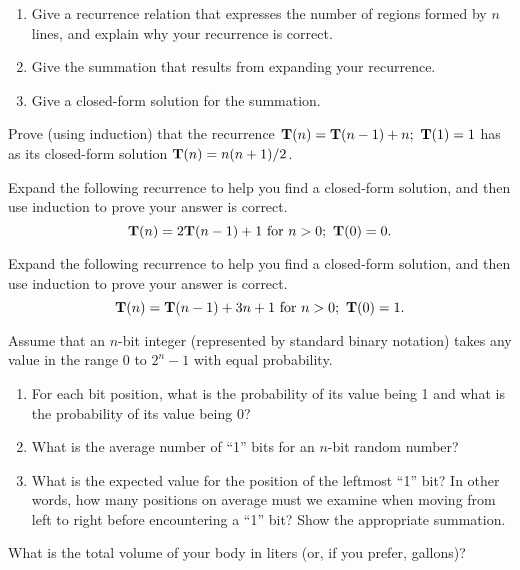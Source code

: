 \begin{exercises}
\begin{enumerate}
\item Give a recurrence relation
that expresses the number of regions
formed by \(n\) lines, and explain why your recurrence is correct.

\item Give the summation that results from expanding your
recurrence.

\item Give a closed-form solution for the summation.
\end{enumerate}

\item
Prove (using induction) that the recurrence
\(\mbox{$\textbf{T}(n)$} = \mbox{$\textbf{T}(n-1)$} + n; \ {\textbf{T}}(1) = 1\)
has as its closed-form solution \(\mbox{$\textbf{T}(n)$} = n(n+1)/2\).

\item
Expand the following recurrence to help you find a closed-form
solution, and then use induction to prove your answer is correct.
\[\Tn = 2\cvar{T}(n-1) + 1\ \mathrm{for}\ n>0;\ \cvar{T}(0) = 0.\]

\item
Expand the following recurrence to help you find a closed-form
solution, and then use induction to prove your answer is correct.
\[\Tn = \cvar{T}(n-1) + 3n + 1\ \mathrm{for}\ n>0;\ \cvar{T}(0) = 1.\]

\item
Assume that an \(n\)-bit integer (represented by standard binary
notation) takes any value in the range 0 to \(2^n-1\) with equal
probability.

\begin{enumerate}
\item For each bit position, what is the probability of its value
being 1 and what is the probability of its value being 0?

\item What is the average number of ``1'' bits for an \(n\)-bit
random number?

\item What is the expected value for the position of the leftmost
``1'' bit?
In other words, how many positions on average must we examine when
moving from left to right before encountering a ``1'' bit?
Show the appropriate summation.
\end{enumerate}

\item
What is the total volume of your body in liters (or, if you prefer,
gallons)?


\end{exercises}
